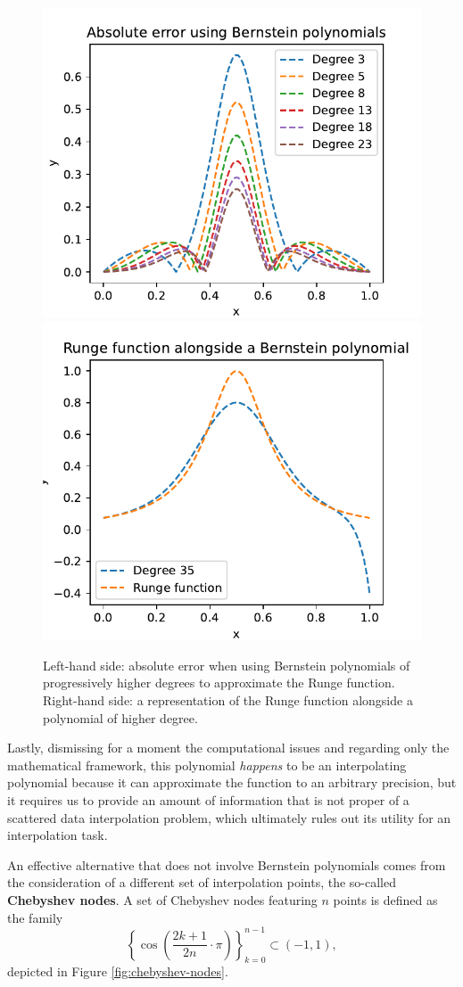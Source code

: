 \documentclass[12pt]{report} %
\newcommand{\tmstrong}[1]{\textbf{#1}}
\begin{document}
\begin{figure}[ht]
  \centering
  \includegraphics[width=.5\textwidth]{imagenes/bernstein/Bernstein_Polynomials_Runge.pdf}\includegraphics[width=.5\textwidth]{imagenes/bernstein/Bernstein_Polynomials_Runge_D35.pdf}
  \caption{Left-hand side: absolute error when using Bernstein polynomials of progressively higher degrees to approximate the Runge function. Right-hand side: a representation of the Runge function alongside a polynomial of higher degree.}
  \label{fig:bernstein-runge}
\end{figure}

Lastly, dismissing for a moment the computational issues and regarding only the mathematical framework, this polynomial \textit{happens} to be an interpolating polynomial because it can approximate the function to an arbitrary precision, but it requires us to provide an amount of information that is not proper of a scattered data interpolation problem, which ultimately rules out its utility for an interpolation task.

An effective alternative that does not involve Bernstein polynomials comes
from the consideration of a different set of interpolation points, the
so-called {\tmstrong{Chebyshev nodes}}. A set of Chebyshev nodes featuring $n$
points is defined as the family
\begin{equation}
  \left\{ \cos \left( \frac{2 k + 1}{2 n} \cdot \pi \right) \right\}_{k =
  0}^{n - 1} \label{eqn-chebyshev-nodes} \subset (- 1, 1),
\end{equation}
depicted in Figure \ref{fig:chebyshev-nodes}.
\end{document}
